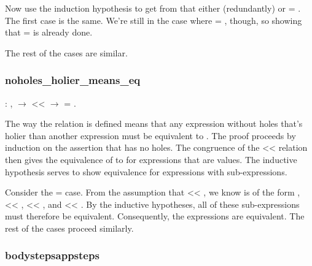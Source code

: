 \documentclass[12pt]{report}
\begin{document}
Now use the induction hypothesis to get from 
 that either (redundantly) 
 or  = . The first case
is the same. We're still in the case where 
= , though, so showing that 
  =  
 is already done.


The rest of the cases are similar. 

\subsubsection{noholes\_holier\_means\_eq}

\begin{coqdoccode}
\coqdocemptyline
\coqdocindent{1.00em}
  : \coqdockw{\ensuremath{\forall}}  ,\coqdoceol
\coqdocindent{2.00em}
  \ensuremath{\rightarrow}\coqdoceol
\coqdocindent{2.00em}
 <<  \ensuremath{\rightarrow}\coqdoceol
\coqdocindent{2.00em}
 = .\coqdoceol
\coqdocemptyline
\end{coqdoccode}

The way the  relation is defined means that any
expression without holes  that's holier than another
expression  must be equivalent to .  The
proof proceeds by induction on the assertion that  has
no holes. The congruence of the << relation then gives the
equivalence of  to  for expressions that
are values.  The inductive hypothesis serves to show equivalence for
expressions with sub-expressions. 

Consider the  =  
  case. From the
assumption that   
 << , we know  is of the
form   
,  << ,
 << , and  <<
. By the inductive hypotheses, all of these
sub-expressions must therefore be equivalent. Consequently, the
 expressions are equivalent. The rest of the cases
proceed similarly. 

\subsubsection{bodystepsappsteps}
\end{document}
